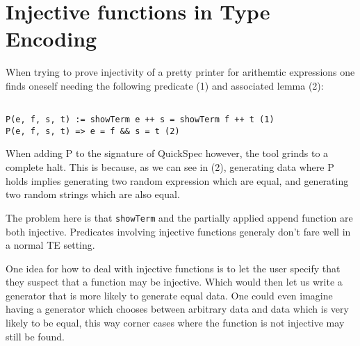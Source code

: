 \section{Injective functions in Type Encoding}
When trying to prove injectivity of a pretty printer for arithemtic expressions one
finds oneself needing the following predicate (1) and associated lemma (2):
\begin{verbatim}

P(e, f, s, t) := showTerm e ++ s = showTerm f ++ t (1)
P(e, f, s, t) => e = f && s = t (2)

\end{verbatim}
When adding P to the signature of QuickSpec however, the tool grinds to a complete halt. This is
because, as we can see in (2), generating data where P holds implies generating two
random expression which are equal, and generating two random strings which are also equal.

The problem here is that \texttt{showTerm} and the partially applied append function are both injective.
Predicates involving injective functions generaly don't fare well in a normal TE setting.

One idea for how to deal with injective functions is to let the user specify that they suspect that 
a function may be injective. Which would then let us write a generator that is more likely to generate
equal data. One could even imagine having a generator which chooses between arbitrary data
and data which is very likely to be equal, this way corner cases where the function is not injective may
still be found.
